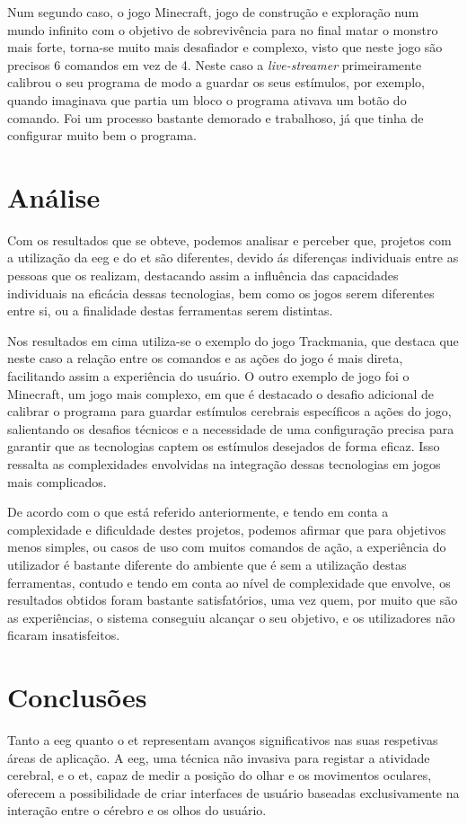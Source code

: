 \documentclass{report}
\begin{document}
Num segundo caso, o jogo Minecraft, jogo de construção e exploração num mundo infinito com o objetivo de sobrevivência para no final matar o monstro mais forte, torna-se muito mais desafiador e complexo, visto que neste jogo são precisos 6 comandos em vez de 4. Neste caso a \textit{live-streamer} primeiramente calibrou o seu programa de modo a guardar os seus estímulos, por exemplo, quando imaginava que partia um bloco o programa ativava um botão do comando. Foi um processo bastante demorado e trabalhoso, já que tinha de configurar muito bem o programa.
\chapter{Análise}
\label{chap.analise}
Com os resultados que se obteve, podemos analisar e perceber que, projetos com a utilização da \ac{eeg} e do \ac{et} são diferentes, devido ás diferenças individuais entre as pessoas que os realizam, destacando assim a influência das capacidades individuais na eficácia dessas tecnologias, bem como os jogos serem diferentes entre si, ou a finalidade destas ferramentas serem distintas.

Nos resultados em cima utiliza-se o exemplo do jogo Trackmania, que destaca que neste caso a relação entre os comandos e as ações do jogo é mais direta, facilitando assim a experiência do usuário. O outro exemplo de jogo foi o Minecraft, um jogo mais complexo, em que é destacado o desafio adicional de calibrar o programa para guardar estímulos cerebrais específicos a ações do jogo, salientando os desafios técnicos e a necessidade de uma configuração precisa para garantir que as tecnologias captem os estímulos desejados de forma eficaz. Isso ressalta as complexidades envolvidas na integração dessas tecnologias em jogos mais complicados.

 De acordo com o que está referido anteriormente, e tendo em conta a complexidade e dificuldade destes projetos, podemos afirmar que para objetivos menos simples, ou casos de uso com muitos comandos de ação, a experiência do utilizador é bastante diferente do ambiente que é sem a utilização destas ferramentas, contudo e tendo em conta ao nível de complexidade que envolve, os resultados obtidos foram bastante satisfatórios, uma vez quem, por muito que são as experiências, o sistema conseguiu alcançar o seu objetivo, e os utilizadores não ficaram insatisfeitos. 
\chapter{Conclusões}
\label{chap.conclusao}
Tanto a \ac{eeg} quanto o \ac{et} representam avanços significativos nas suas respetivas áreas de aplicação. A \ac{eeg}, uma técnica não invasiva para registar a atividade cerebral, e o \ac{et}, capaz de medir a posição do olhar e os movimentos oculares, oferecem a possibilidade de criar interfaces de usuário baseadas exclusivamente na interação entre o cérebro e os olhos do usuário.
\end{document}
